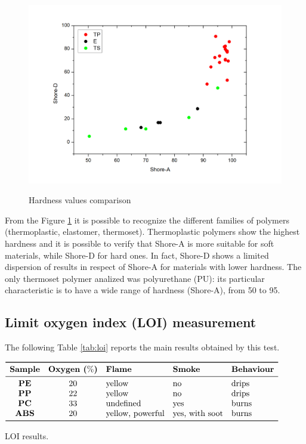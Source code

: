 \documentclass[a4paper, 11pt]{article}
\begin{document}
\begin{figure}[htp]
	\centering
	{\includegraphics[scale=0.3]{duro}}
	\captionsetup{justification=centering}
	\caption{Hardness values comparison}
	\label{fig:duro}
\end{figure}

From the Figure \ref{fig:duro} it is possible to recognize the different families of polymers (thermoplastic, elastomer, thermoset). Thermoplastic polymers show the highest hardness and it is possible to verify that Shore-A is more suitable for soft materials, while Shore-D for hard ones. In fact, Shore-D shows a limited dispersion of results in respect of Shore-A for materials with lower hardness. The only thermoset polymer analized was polyurethane (PU): its particular characteristic is to have a wide range of hardness (Shore-A), from 50 to 95.

\subsection{Limit oxygen index (LOI) measurement} 

The following Table \ref{tab:loi} reports the main results obtained by this test.
\begin{table}[htp]
	\centering
	$
	\begin{array}{cclll}
	\toprule
	\textbf{Sample} & \textbf{Oxygen ($\%$)} & \textbf{Flame} & \textbf{Smoke} & \textbf{Behaviour} \\
	\midrule
	\textbf{PE} & 20 & \text{yellow} & \text{no} & \text{drips}\\
	\textbf{PP} & 22 & \text{yellow} & \text{no} & \text{drips}\\
	\textbf{PC} & 33 & \text{undefined} & \text{yes} & \text{burns}\\
	\textbf{ABS} & 20 & \text{yellow, powerful} & \text{yes, with soot} & \text{burns}\\
	\bottomrule
	\end{array}
	$
	\caption{LOI results.}
	\label{tab:loi}
\end{table}
\end{document}
